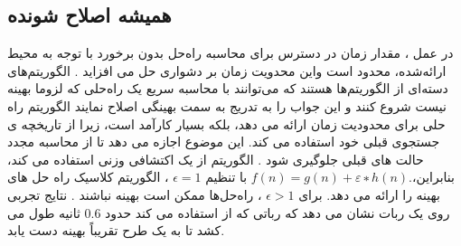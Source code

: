 \subsection{همیشه اصلاح شونده}
در  عمل ، مقدار زمان در دسترس برای محاسبه راه‌حل بدون برخورد با توجه به محیط ارائه‌شده، محدود است واین محدویت زمان بر دشواری  حل می افزاید . الگوریتم‌های  دسته‌ای از الگوریتم‌ها هستند که می‌توانند با محاسبه سریع یک راه‌حلی که لزوما بهینه نیست  شروع کنند و این جواب را به تدریج به سمت بهینگی اصلاح نمایند  الگوریتم  راه حلی برای محدودیت زمان  ارائه می دهد، بلکه بسیار کارآمد است، زیرا از تاریخچه ی جستجوی قبلی خود استفاده می کند. این موضوع  اجازه می دهد تا از محاسبه مجدد حالت های قبلی جلوگیری شود . الگوریتم از یک اکتشافی وزنی استفاده می کند، بنابراین،$ f(n) = g(n) + ε∗ h(n).$ با تنظیم 
$\epsilon=1$  
، الگوریتم کلاسیک  راه حل های بهینه را ارائه می دهد. برای
$\epsilon>1$ 
، راه‌حل‌ها ممکن است بهینه نباشند . نتایج تجربی روی یک ربات نشان می دهد که رباتی که از 
استفاده می کند حدود 0.6 ثانیه طول می کشد تا به یک طرح تقریباً بهینه دست یابد. 


